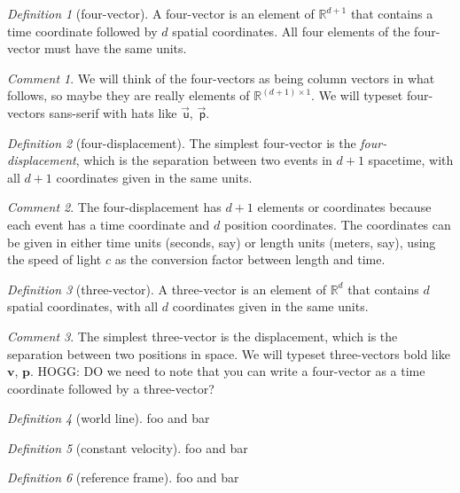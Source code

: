 \documentclass[10pt]{article}
\newcounter{par}
\theoremstyle{remark}
\newtheorem{definition}{Definition}
\theoremstyle{remark}
\newtheorem*{remark}{Comment}
\newcommand\upvec[1]{\!\vec{\,\mathrm{#1}}}
\newcommand{\tv}[1]{{\mathbf{#1}}} %
\newcommand{\fv}[1]{\upvec{\mathsf{#1}}} %
\begin{document}
\begin{definition}[four-vector]
    A four-vector is an element of $\mathbb{R}^{d+1}$ that contains a time coordinate followed by $d$ spatial coordinates.
    All four elements of the four-vector must have the same units.
\end{definition}
\begin{remark}
    We will think of the four-vectors as being column vectors in what follows, so maybe they are really elements of $\mathbb{R}^{(d+1)\times 1}$.
    We will typeset four-vectors sans-serif with hats like $\fv{u}$, $\fv{p}$.
\end{remark}

\begin{definition}[four-displacement]
    The simplest four-vector is the \emph{four-displacement}, which is the separation between two events in $d+1$ spacetime, with all $d+1$ coordinates given in the same units.
\end{definition}
\begin{remark}
    The four-displacement has $d+1$ elements or coordinates because each event has a time coordinate and $d$ position coordinates.
    The coordinates can be given in either time units (seconds, say) or length units (meters, say), using the speed of light $c$ as the conversion factor between length and time.
\end{remark}

\begin{definition}[three-vector]
    A three-vector is an element of $\mathbb{R}^{d}$ that contains $d$ spatial coordinates, with all $d$ coordinates given in the same units.
\end{definition}
\begin{remark}
    The simplest three-vector is the displacement, which is the separation between two positions in space.
    We will typeset three-vectors bold like $\tv{v}$, $\tv{p}$.
    HOGG: DO we need to note that you can write a four-vector as a time coordinate followed by a three-vector?
\end{remark}

\begin{definition}[world line]
    foo and bar
\end{definition}

\begin{definition}[constant velocity]
    foo and bar
\end{definition}

\begin{definition}[reference frame]
    foo and bar
\end{definition}
\end{document}

